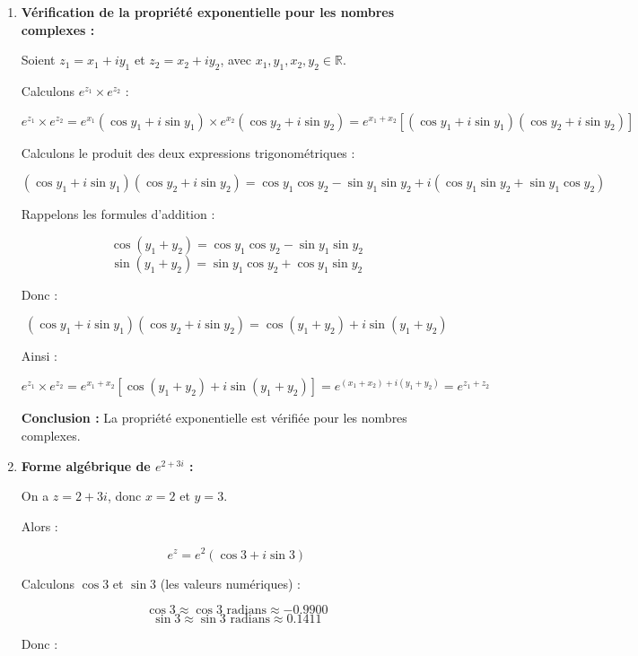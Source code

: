 \documentclass[a4paper,12pt]{article}
\begin{document}
\begin{solutionbox}
\begin{enumerate}
    \item \textbf{Vérification de la propriété exponentielle pour les nombres complexes :}

    Soient \( z_1 = x_1 + i y_1 \) et \( z_2 = x_2 + i y_2 \), avec \( x_1, y_1, x_2, y_2 \in \mathbb{R} \).

    Calculons \( e^{z_1} \times e^{z_2} \) :

    \[
    e^{z_1} \times e^{z_2} = e^{x_1} (\cos y_1 + i \sin y_1) \times e^{x_2} (\cos y_2 + i \sin y_2) = e^{x_1 + x_2} [ (\cos y_1 + i \sin y_1)(\cos y_2 + i \sin y_2) ]
    \]

    Calculons le produit des deux expressions trigonométriques :

    \[
    (\cos y_1 + i \sin y_1)(\cos y_2 + i \sin y_2) = \cos y_1 \cos y_2 - \sin y_1 \sin y_2 + i (\cos y_1 \sin y_2 + \sin y_1 \cos y_2)
    \]

    Rappelons les formules d'addition :

    \[
    \cos(y_1 + y_2) = \cos y_1 \cos y_2 - \sin y_1 \sin y_2
    \]
    \[
    \sin(y_1 + y_2) = \sin y_1 \cos y_2 + \cos y_1 \sin y_2
    \]

    Donc :

    \[
    (\cos y_1 + i \sin y_1)(\cos y_2 + i \sin y_2) = \cos(y_1 + y_2) + i \sin(y_1 + y_2)
    \]

    Ainsi :

    \[
    e^{z_1} \times e^{z_2} = e^{x_1 + x_2} [ \cos(y_1 + y_2) + i \sin(y_1 + y_2) ] = e^{(x_1 + x_2) + i (y_1 + y_2)} = e^{z_1 + z_2}
    \]

    \textbf{Conclusion :} La propriété exponentielle est vérifiée pour les nombres complexes.

    \item \textbf{Forme algébrique de \( e^{2 + 3i} \) :}

    On a \( z = 2 + 3i \), donc \( x = 2 \) et \( y = 3 \).

    Alors :

    \[
    e^z = e^{2} (\cos 3 + i \sin 3)
    \]

    Calculons \( \cos 3 \) et \( \sin 3 \) (les valeurs numériques) :

    \[
    \cos 3 \approx \cos 3 \text{ radians} \approx -0.9900
    \]
    \[
    \sin 3 \approx \sin 3 \text{ radians} \approx 0.1411
    \]

    Donc :


\end{enumerate}
\end{solutionbox}
\end{document}
